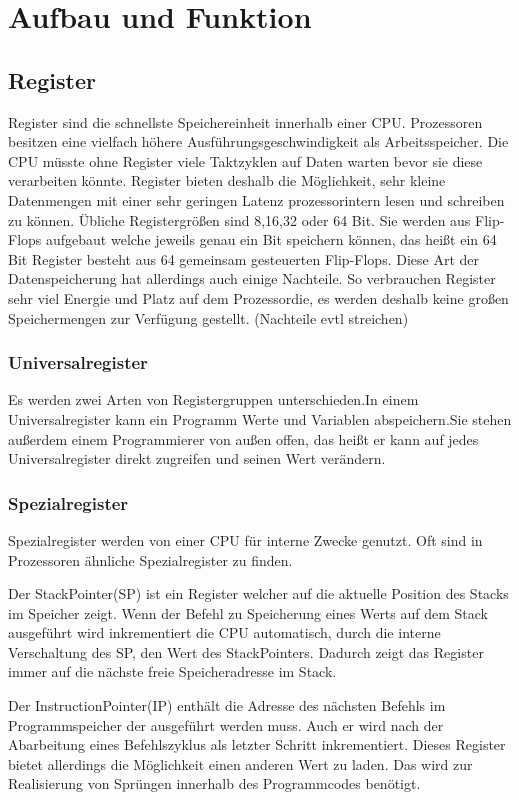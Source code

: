 \documentclass[12pt]{article}
\begin{document}
\section{Aufbau und Funktion}
\subsection{Register}
Register sind die schnellste Speichereinheit innerhalb einer CPU. Prozessoren besitzen eine vielfach höhere Ausführungsgeschwindigkeit als Arbeitsspeicher. Die CPU müsste ohne Register viele Taktzyklen auf Daten warten bevor sie diese verarbeiten könnte. Register bieten deshalb die Möglichkeit, sehr kleine Datenmengen mit einer sehr geringen Latenz prozessorintern lesen und schreiben zu können. Übliche Registergrößen sind 8,16,32 oder 64 Bit.\cite{mikroprozessortechnik2011} Sie werden aus Flip-Flops aufgebaut welche jeweils genau ein Bit speichern können, das heißt ein 64 Bit Register besteht aus 64 gemeinsam gesteuerten Flip-Flops.\cite{mikroprozessortechnik2011} Diese Art der Datenspeicherung hat allerdings auch einige Nachteile. So verbrauchen Register sehr viel Energie und Platz auf dem Prozessordie, es werden deshalb keine großen Speichermengen zur Verfügung gestellt. (Nachteile evtl streichen)

\subsubsection{Universalregister}
Es werden zwei Arten von Registergruppen unterschieden.In einem Universalregister kann ein Programm Werte und Variablen abspeichern.Sie stehen außerdem einem Programmierer von außen offen, das heißt er kann auf jedes Universalregister direkt zugreifen und seinen Wert verändern.

\subsubsection{Spezialregister}
Spezialregister werden von einer CPU für interne Zwecke genutzt. Oft sind in Prozessoren ähnliche Spezialregister zu finden. 

Der StackPointer(SP) ist ein Register welcher auf die aktuelle Position des Stacks im Speicher zeigt. Wenn der Befehl zu Speicherung eines Werts auf dem Stack ausgeführt wird inkrementiert die CPU automatisch, durch die interne Verschaltung des SP, den Wert des StackPointers. Dadurch zeigt das Register immer auf die nächste freie Speicheradresse im Stack.

Der InstructionPointer(IP) enthält die Adresse des nächsten Befehls im Programmspeicher der ausgeführt werden muss. Auch er wird nach der Abarbeitung eines Befehlszyklus als letzter Schritt inkrementiert. Dieses Register bietet allerdings die Möglichkeit einen anderen Wert zu laden. Das wird zur Realisierung von Sprüngen innerhalb des Programmcodes benötigt. 
\end{document}
